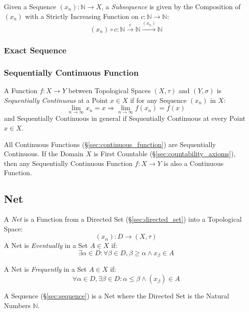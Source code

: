 Given a Sequence $(x_n) : \mathbb{N} \rightarrow X$, a
\emph{Subsequence} is given by the Composition of $(x_n)$ with a
Strictly Increasing Function on $c : \mathbb{N} \rightarrow
\mathbb{N}$:
\[
  (x_n) \circ c :
  \mathbb{N} \xrightarrow{c} \mathbb{N} \xrightarrow{(x_n)} \mathbb{N}
\]



\subsubsection{Exact Sequence}\label{sec:exact_sequence}

\subsubsection{Sequentially Continuous Function}
\label{sec:sequentially_continuous}

A Function $f : X \rightarrow Y$ between Topological Spaces $(X,
\tau)$ and $(Y, \sigma)$ is \emph{Sequentially Continuous} at a Point
$x \in X$ if for any Sequence $(x_n)$ in $X$:
\[
  \lim_{n \rightarrow \infty} x_n = x
  \Rightarrow \lim_{n \rightarrow \infty} f(x_n) = f(x)
\]
and Sequentially Continuous in general if Sequentially Continuous at
every Point $x \in X$.

All Continuous Functions (\S\ref{sec:continuous_function}) are
Sequentially Continuous. If the Domain $X$ is First Countable
(\S\ref{sec:countability_axioms}), then any Sequentially Continuous
Function $f : X \rightarrow Y$ is also a Continuous Function.



\subsection{Net}\label{sec:net}

A \emph{Net} is a Function from a Directed Set (\S\ref{sec:directed_set}) into
a Topological Space:
\[
  (x_\alpha) : D \rightarrow (X, \tau)
\]
A Net is \emph{Eventually} in a Set $A \in X$ if:
\[
  \exists \alpha \in D
  : \forall \beta \in D, \beta \geq \alpha \wedge x_\beta \in A
\]

A Net is \emph{Frequently} in a Set $A \in X$ if:
\[
  \forall \alpha \in D, \exists \beta \in D
  : \alpha \leq \beta \wedge (x_\beta) \in A
\]

A Sequence (\S\ref{sec:sequence}) is a Net where the Directed Set is the
Natural Numbers $\mathbb{N}$.

